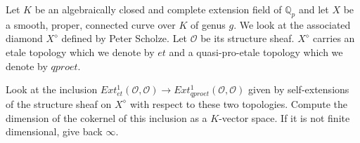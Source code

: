 Let $K$ be an algebraically closed and complete extension field of $\mathbb{Q}_p$ and let $X$ be a smooth, proper, connected curve over $K$ of genus $g$. We look at the associated diamond $X^\diamond$ defined by Peter Scholze. Let $\mathcal{O}$ be its structure sheaf. $X^\diamond$ carries an etale topology which we denote by $et$ and a quasi-pro-etale topology which we denote by $qproet$.

Look at the inclusion $Ext^1_{et}(\mathcal{O}, \mathcal{O}) \rightarrow Ext^1_{qproet}(\mathcal{O}, \mathcal{O})$ given by self-extensions of the structure sheaf on $X^\diamond$ with respect to these two topologies. Compute the dimension of the cokernel of this inclusion as a $K$-vector space. If it is not finite dimensional, give back $\infty$.
